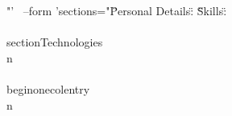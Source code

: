 "' \
--form 'sections="{\"Personal Details\": \"%
  \"Skills\": \"\\\\section{Technologies}\\n        \\\\begin{onecolentry}\\n            }
